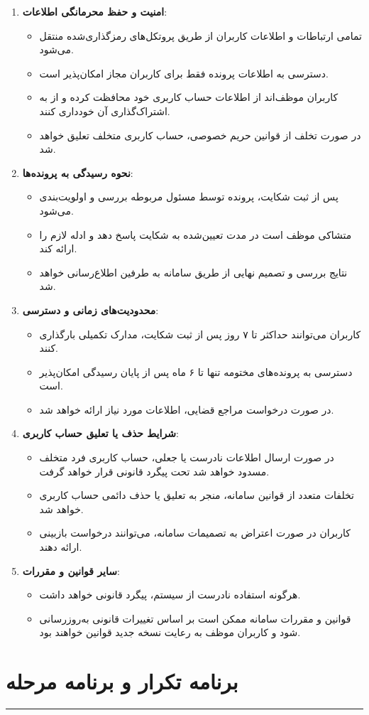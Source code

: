 \documentclass[12pt,a4paper,oneside]{article}
\begin{document}
\begin{enumerate}
    \item \textbf{امنیت و حفظ محرمانگی اطلاعات}:
    \begin{itemize}
        \item تمامی ارتباطات و اطلاعات کاربران از طریق پروتکل‌های رمزگذاری‌شده منتقل می‌شود.
        \item دسترسی به اطلاعات پرونده فقط برای کاربران مجاز امکان‌پذیر است.
        \item کاربران موظف‌اند از اطلاعات حساب کاربری خود محافظت کرده و از به اشتراک‌گذاری آن خودداری کنند.
        \item در صورت تخلف از قوانین حریم خصوصی، حساب کاربری متخلف تعلیق خواهد شد.
    \end{itemize}

    \item \textbf{نحوه رسیدگی به پرونده‌ها}:
    \begin{itemize}
        \item پس از ثبت شکایت، پرونده توسط مسئول مربوطه بررسی و اولویت‌بندی می‌شود.
        \item متشاکی موظف است در مدت تعیین‌شده به شکایت پاسخ دهد و ادله لازم را ارائه کند.
        \item نتایج بررسی و تصمیم نهایی از طریق سامانه به طرفین اطلاع‌رسانی خواهد شد.
    \end{itemize}

    \item \textbf{محدودیت‌های زمانی و دسترسی}:
    \begin{itemize}
        \item کاربران می‌توانند حداکثر تا ۷ روز پس از ثبت شکایت، مدارک تکمیلی بارگذاری کنند.
        \item دسترسی به پرونده‌های مختومه تنها تا ۶ ماه پس از پایان رسیدگی امکان‌پذیر است.
        \item در صورت درخواست مراجع قضایی، اطلاعات مورد نیاز ارائه خواهد شد.
    \end{itemize}

    \item \textbf{شرایط حذف یا تعلیق حساب کاربری}:
    \begin{itemize}
        \item در صورت ارسال اطلاعات نادرست یا جعلی، حساب کاربری فرد متخلف مسدود خواهد شد تحت پیگرد قانونی قرار خواهد گرفت.
        \item تخلفات متعدد از قوانین سامانه، منجر به تعلیق یا حذف دائمی حساب کاربری خواهد شد.
        \item کاربران در صورت اعتراض به تصمیمات سامانه، می‌توانند درخواست بازبینی ارائه دهند.
    \end{itemize}

    \item \textbf{سایر قوانین و مقررات}:
    \begin{itemize}
        \item هرگونه استفاده نادرست از سیستم، پیگرد قانونی خواهد داشت.
        \item قوانین و مقررات سامانه ممکن است بر اساس تغییرات قانونی به‌روزرسانی شود و کاربران موظف به رعایت نسخه جدید قوانین خواهند بود.
    \end{itemize}
\end{enumerate}

	\newpage
	\section{برنامه تکرار و برنامه مرحله}
		\vspace{-2em} 
		\par\noindent\rule{\textwidth}{0.72pt}
		
\end{document}
